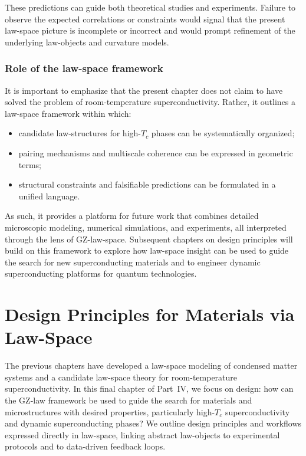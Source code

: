 \documentclass[11pt]{book}
\theoremstyle{plain}
\theoremstyle{definition}
\theoremstyle{remark}
\begin{document}
These predictions can guide both theoretical studies and experiments.
Failure to observe the expected correlations or constraints would
signal that the present law-space picture is incomplete or incorrect
and would prompt refinement of the underlying law-objects and
curvature models.

\subsection*{Role of the law-space framework}

It is important to emphasize that the present chapter does not claim
to have solved the problem of room-temperature superconductivity.
Rather, it outlines a law-space framework within which:
\begin{itemize}
  \item candidate law-structures for high-$T_c$ phases can be
        systematically organized;
  \item pairing mechanisms and multiscale coherence can be expressed
        in geometric terms;
  \item structural constraints and falsifiable predictions can be
        formulated in a unified language.
\end{itemize}

As such, it provides a platform for future work that combines
detailed microscopic modeling, numerical simulations, and
experiments, all interpreted through the lens of GZ-law-space.
Subsequent chapters on design principles will build on this
framework to explore how law-space insight can be used to guide the
search for new superconducting materials and to engineer dynamic
superconducting platforms for quantum technologies.



\chapter[Design Principles for Materials via Law-Space]{Design Principles for Materials via Law-Space}
\label{chap:design-principles-lawspace-materials}


The previous chapters have developed a law-space modeling of
condensed matter systems and a candidate law-space theory for
room-temperature superconductivity. In this final chapter of
Part~IV, we focus on design: how can the GZ-law framework be used to
guide the search for materials and microstructures with desired
properties, particularly high-$T_c$ superconductivity and dynamic
superconducting phases? We outline design principles and workflows
expressed directly in law-space, linking abstract law-objects to
experimental protocols and to data-driven feedback loops.
\end{document}
